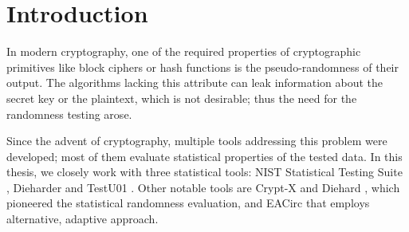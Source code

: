 \documentclass[
	digital,    %
	oneside,    %
	color,
	11pt,
	nocover,
	notable,
	nolof,
	nolot,
]{fithesis3}
\theoremstyle{definition}
\theoremstyle{remark}
\begin{document}

\makeatletter
\def\thesis@blocks@thanks{%
	\ifx\thesis@thanks\undefined\else
		\thesis@blocks@clear
		\begin{alwayssingle}%
			\chapter*{\thesis@@{thanksTitle}}%
			\leavevmode\thesis@thanks
		\end{alwayssingle}%
	\fi}
\def\thesis@blocks@abstract{%
	\begin{alwayssingle}%
	{\def\clearpage{}
		\chapter*{\thesis@@{abstractTitle}}}%
		\noindent\thesis@abstract
		\par\vfil\null
		\clearpage{}
	\end{alwayssingle}}
\def\thesis@blocks@keywords{%
	\begin{alwayssingle}%
	{\def\clearpage{}
		\chapter*{\thesis@@{keywordsTitle}}}%
		\noindent\thesis@keywords
		\par\vfil\null
		\clearpage{}
	\end{alwayssingle}}
\thesis@preamble
\makeatother

\chapter{Introduction}
In modern cryptography, one of the required properties of cryptographic primitives like block ciphers or hash functions is the pseudo-randomness of their output. The algorithms lacking this attribute can leak information about the secret key or the plaintext, which is not desirable; thus the need for the randomness testing arose.

Since the advent of cryptography, multiple tools addressing this problem were developed; most of them evaluate statistical properties of the tested data. In this thesis, we closely work with three statistical tools: NIST Statistical Testing Suite \cite{nist-sts}, Dieharder \cite{dieharder} and TestU01 \cite{testu01-paper}. Other notable tools are Crypt-X \cite{crypt-x} and Diehard \cite{diehard}, which pioneered the statistical randomness evaluation, and EACirc \cite{eacirc-github} that employs alternative, adaptive approach.
\end{document}
